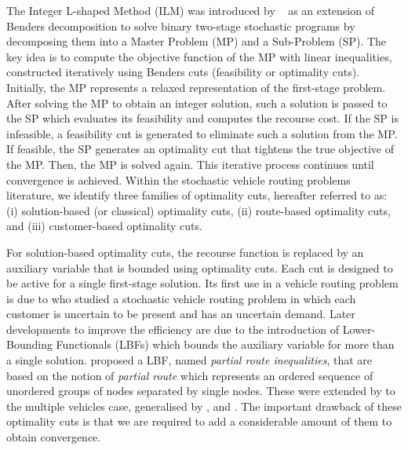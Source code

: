 \documentclass[11pt]{article}
\theoremstyle{definition}
\begin{document}
The Integer L-shaped Method (ILM) was introduced by ~\citet{LAPORTE1993133} as an extension of Benders decomposition to solve binary two-stage stochastic programs by decomposing them into a Master Problem (MP) and a Sub-Problem (SP). The key idea is to compute the objective function of the MP with linear inequalities, constructed iteratively using Benders cuts (feasibility or optimality cuts). Initially, the MP represents a relaxed representation of the first-stage problem. After solving the MP to obtain an integer solution, such a solution is passed to the SP which evaluates its feasibility and computes the recourse cost. If the SP is infeasible, a feasibility cut is generated to eliminate such a solution from the MP. If feasible, the SP generates an optimality cut that tightens the true objective of the MP. Then, the MP is solved again. This iterative process continues until convergence is achieved. Within the stochastic vehicle routing problems literature, we identify three families of optimality cuts, hereafter referred to as: (i) solution-based (or classical) optimality cuts, (ii) route-based optimality cuts, and (iii) customer-based optimality cuts. %



For solution-based optimality cuts, the recourse function is replaced by an auxiliary variable that is bounded using optimality cuts. Each cut is designed to be active for a single first-stage solution. Its first use in a vehicle routing problem is due to \citet{Gendreau1995} who studied a stochastic vehicle routing problem in which each customer is uncertain to be present and has an uncertain demand. Later developments to improve the efficiency are due to the introduction of Lower-Bounding Functionals (LBFs) which bounds the auxiliary variable for more than a single solution. \citet{Hjorring1999} proposed a LBF, named \textit{partial route inequalities}, that are based on the notion of \textit{partial route} which represents an ordered sequence of unordered groups of nodes separated by single nodes. These were extended by \cite{Laporte2002} to the multiple vehicles case, generalised by \cite{Jabali2014}, \cite{salavati2019exact} and \cite{Hoogendoorn2023}. The important drawback of these optimality cuts is that we are required to add a considerable amount of them to obtain convergence.
\end{document}
